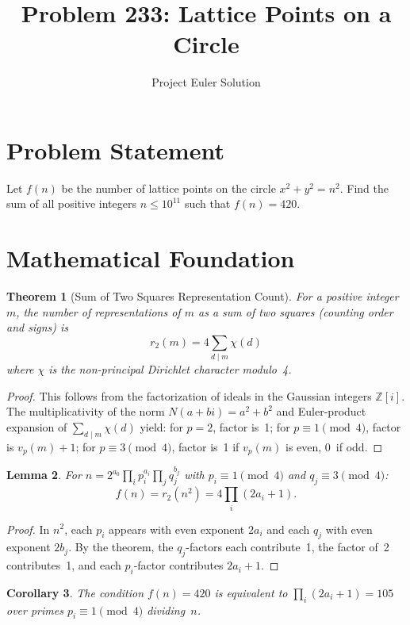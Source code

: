 \documentclass[12pt]{article}
\title{Problem 233: Lattice Points on a Circle}
\author{Project Euler Solution}
\date{}
\newtheorem{theorem}{Theorem}
\newtheorem{lemma}[theorem]{Lemma}
\newtheorem{corollary}[theorem]{Corollary}
\begin{document}
\maketitle

\section{Problem Statement}
Let $f(n)$ be the number of lattice points on the circle $x^2 + y^2 = n^2$. Find the sum of all positive integers $n \leq 10^{11}$ such that $f(n) = 420$.

\section{Mathematical Foundation}

\begin{theorem}[Sum of Two Squares Representation Count]
For a positive integer $m$, the number of representations of $m$ as a sum of two squares (counting order and signs) is
\[
r_2(m) = 4 \sum_{d \mid m} \chi(d)
\]
where $\chi$ is the non-principal Dirichlet character modulo~4.
\end{theorem}

\begin{proof}
This follows from the factorization of ideals in the Gaussian integers $\mathbb{Z}[i]$. The multiplicativity of the norm $N(a+bi) = a^2 + b^2$ and Euler-product expansion of $\sum_{d \mid m} \chi(d)$ yield: for $p = 2$, factor is~1; for $p \equiv 1\pmod{4}$, factor is $v_p(m)+1$; for $p \equiv 3\pmod{4}$, factor is~1 if $v_p(m)$ is even, 0~if odd.
\end{proof}

\begin{lemma}
For $n = 2^{a_0} \prod_i p_i^{a_i} \prod_j q_j^{b_j}$ with $p_i \equiv 1\pmod{4}$ and $q_j \equiv 3\pmod{4}$:
\[
f(n) = r_2(n^2) = 4\prod_i (2a_i + 1).
\]
\end{lemma}

\begin{proof}
In $n^2$, each $p_i$ appears with even exponent $2a_i$ and each $q_j$ with even exponent $2b_j$. By the theorem, the $q_j$-factors each contribute~1, the factor of~2 contributes~1, and each $p_i$-factor contributes $2a_i + 1$.
\end{proof}

\begin{corollary}
The condition $f(n) = 420$ is equivalent to $\prod_i (2a_i + 1) = 105$ over primes $p_i \equiv 1\pmod{4}$ dividing~$n$.
\end{corollary}
\end{document}
